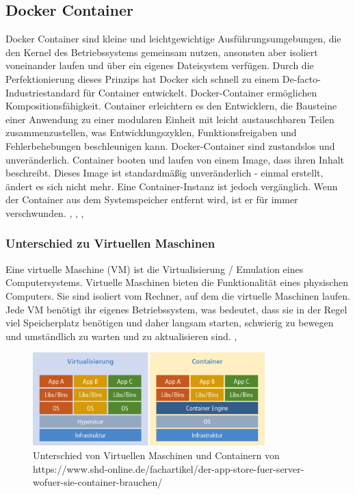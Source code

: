 \subsection{Docker Container}
Docker Container sind kleine und leichtgewichtige Ausführungsumgebungen, die den Kernel des 
Betriebssystems gemeinsam nutzen, ansonsten aber isoliert voneinander laufen und 
über ein eigenes Dateisystem verfügen. Durch die Perfektionierung dieses Prinzips hat Docker sich 
schnell zu einem De-facto-Industriestandard für Container entwickelt.
\newline
\newline
Docker-Container ermöglichen Kompositionsfähigkeit. Container erleichtern es den Entwicklern, die 
Bausteine einer Anwendung zu einer modularen Einheit mit leicht austauschbaren Teilen  
zusammenzustellen, was Entwicklungszyklen, Funktionsfreigaben und Fehlerbehebungen beschleunigen 
kann. Docker-Container sind zustandslos und unveränderlich. Container booten und laufen von einem Image, 
dass ihren Inhalt beschreibt. Dieses Image ist standardmäßig unveränderlich - einmal erstellt, 
ändert es sich nicht mehr. Eine Container-Instanz ist jedoch vergänglich. Wenn der Container aus dem 
Systemspeicher entfernt wird, ist er für immer verschwunden. \cite{noauthor_docker_nodate}, \cite{noauthor_install_nodate}, \cite{noauthor_docker_2022}, \cite{noauthor_was_nodate-5}

\subsubsection{Unterschied zu Virtuellen Maschinen}
Eine virtuelle Maschine (VM) ist die Virtualisierung / Emulation eines Computersystems. 
Virtuelle Maschinen bieten die Funktionalität eines physischen Computers. 
Sie sind isoliert vom Rechner, auf dem die virtuelle Maschinen laufen.
Jede VM benötigt ihr eigenes Betriebssystem, was bedeutet, dass sie in der Regel viel Speicherplatz benötigen und daher
langsam starten, schwierig zu bewegen und umständlich zu warten und zu aktualisieren sind. \cite{noauthor_virtuelle_2021}, \cite{noauthor_was_nodate-6}

\begin{figure}[H]
  \includegraphics[width=0.8\textwidth]{pics/Container_VM.png}
  \centering
  \caption{Unterschied von Virtuellen Maschinen und Containern von https://www.shd-online.de/fachartikel/der-app-store-fuer-server-wofuer-sie-container-brauchen/}
\end{figure}

